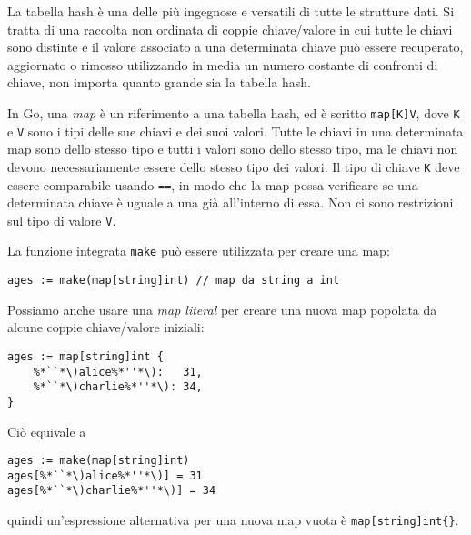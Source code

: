 %
La tabella hash è una delle più ingegnose e versatili di tutte le strutture dati.
Si tratta di una raccolta non ordinata di coppie chiave/valore in cui tutte le chiavi sono distinte e il valore associato a una determinata chiave può essere recuperato, aggiornato o rimosso utilizzando in media un numero costante di confronti di chiave, non importa quanto grande sia la tabella hash.

In Go, una \textit{map} è un riferimento a una tabella hash, ed è scritto \verb|map[K]V|, dove \verb|K| e \verb|V| sono i tipi delle sue chiavi e dei suoi valori.
Tutte le chiavi in una determinata map sono dello stesso tipo e tutti i valori sono dello stesso tipo, ma le chiavi non devono necessariamente essere dello stesso tipo dei valori.
Il tipo di chiave \verb|K| deve essere comparabile usando \verb|==|, in modo che la map possa verificare se una determinata chiave è uguale a una già all'interno di essa.
Non ci sono restrizioni sul tipo di valore \verb|V|.

La funzione integrata \verb|make| può essere utilizzata per creare una map:
\begin{lstlisting}[label={lst:lstlisting3-3.1}]
ages := make(map[string]int) // map da string a int
\end{lstlisting}
Possiamo anche usare una \textit{map literal} per creare una nuova map popolata da alcune coppie chiave/valore iniziali:
\begin{lstlisting}[frame=single, label={lst:lstlisting3-3.2}]
ages := map[string]int {
    %*``*\)alice%*''*\):   31,
    %*``*\)charlie%*''*\): 34,
}
\end{lstlisting}
Ciò equivale a
\begin{lstlisting}[frame=single, label={lst:lstlisting3-3.3}]
ages := make(map[string]int)
ages[%*``*\)alice%*''*\)] = 31
ages[%*``*\)charlie%*''*\)] = 34
\end{lstlisting}
quindi un'espressione alternativa per una nuova map vuota è \verb|map[string]int{}|.


